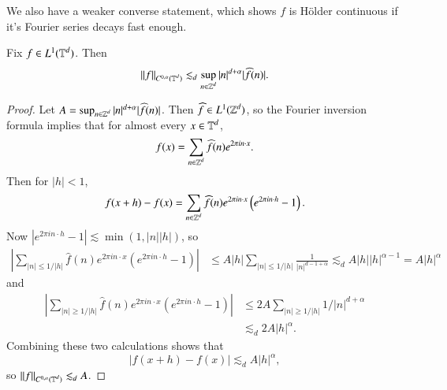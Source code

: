 We also have a weaker converse statement, which shows $f$ is H\"{o}lder continuous if it's Fourier series decays fast enough.

\begin{theorem}
    Fix $f \in L^1(\operatorname{\mathbb{T}}^d)$. Then
    \[ \| f \|_{C^{0,\alpha}(\operatorname{\mathbb{T}}^d)} \lesssim_d \sup_{n \in \operatorname{\mathbb{Z}}^d} |n|^{d + \alpha} |\widehat{f}(n)|. \]
\end{theorem}
\begin{proof}
    Let $A = \sup_{n \in \operatorname{\mathbb{Z}}^d} |n|^{d+\alpha} |\widehat{f}(n)|$. Then $\widehat{f} \in L^1(\operatorname{\mathbb{Z}}^d)$, so the Fourier inversion formula implies that for almost every $x \in \operatorname{\mathbb{T}}^d$,
    \[ f(x) = \sum_{n \in \operatorname{\mathbb{Z}}^d} \widehat{f}(n) e^{2 \pi i n \cdot x}. \]
    Then for $|h| < 1$,
    \[ f(x + h) - f(x) = \sum_{n \in \operatorname{\mathbb{Z}}^d} \widehat{f}(n) e^{2 \pi i n \cdot x} \left( e^{2 \pi i n \cdot h} - 1 \right). \]
    Now $|e^{2 \pi i n \cdot h} - 1| \lesssim \min(1, |n| |h|)$, so
    \begin{align*}
        \left| \sum_{ |n| \leq 1/|h|} \widehat{f}(n) e^{2 \pi i n \cdot x} \left( e^{2 \pi i n \cdot h} - 1 \right) \right| &\leq A|h| \sum_{|n| \leq 1/|h|} \frac{1}{|n|^{d - 1 + \alpha}} \lesssim_d A |h| |h|^{\alpha - 1} = A |h|^\alpha
    \end{align*}
    and
    \begin{align*}
        \left| \sum_{ |n| \geq 1/|h|} \widehat{f}(n) e^{2 \pi i n \cdot x} \left( e^{2 \pi i n \cdot h} - 1 \right) \right| &\leq 2A \sum_{|n| \geq 1/|h|} 1/|n|^{d + \alpha}\\
        &\lesssim_d 2A |h|^\alpha.
    \end{align*}
    Combining these two calculations shows that
    \[ |f(x+h) - f(x)| \lesssim_d A |h|^\alpha,  \]
    so $\| f \|_{C^{0,\alpha}(\operatorname{\mathbb{T}}^d)} \lesssim_d A$.
\end{proof}

